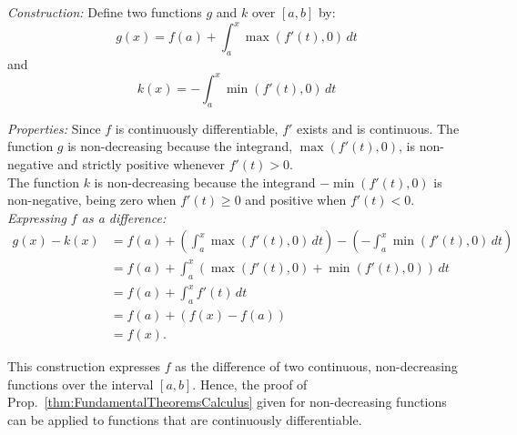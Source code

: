 \textit{Construction:} Define two functions \( g \) and \( k \) over \([a, b]\) by:
\[
g(x) = f(a) + \int_a^x \max(f'(t), 0) \, dt 
\]
and
\[
k(x) = -\int_a^x \min(f'(t), 0) \, dt
\]

\textit{Properties:}  Since \( f \) is continuously differentiable, \( f' \) exists and is continuous. The function \( g \) is non-decreasing because the integrand, \(\max(f'(t), 0)\), is non-negative and strictly positive whenever \( f'(t) > 0 \). \\

The function \( k \) is non-decreasing because the integrand \(-\min(f'(t), 0)\) is non-negative, being zero when \( f'(t) \geq 0 \) and positive when \( f'(t) < 0 \).\\

\textit{Expressing \( f \) as a difference:}
\begin{align*}
g(x) - k(x) &=  f(a) + \left( \int_a^x \max(f'(t), 0) \, dt \right) - \left( -\int_a^x \min(f'(t), 0) \, dt \right) \\
&= f(a) +  \int_a^x (\max(f'(t), 0) + \min(f'(t), 0)) \, dt  \\
&= f(a) +  \int_a^x f'(t) \, dt  \\
&= f(a) + \left(f(x) - f(a)\right) \\
&= f(x).
\end{align*}

\bigskip

This construction expresses \( f \) as the difference of two continuous, non-decreasing functions over the interval \([a, b]\). Hence, the proof of Prop.~\ref{thm:FundamentalTheoremsCalculus} given for non-decreasing functions can be applied to functions that are continuously differentiable.



